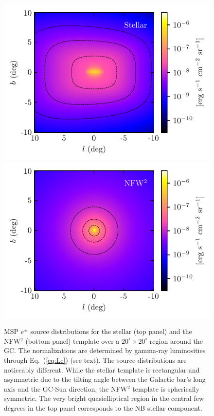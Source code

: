 \documentclass[%
reprint,
superscriptaddress,
amsmath,amssymb,
aps,
floatfix,
]{revtex4-1}
\begin{document}
\begin{figure}[t!]
  \includegraphics[width = \columnwidth]{injection_skymap_bulge.pdf}
  \includegraphics[width = \columnwidth]{injection_skymap_nfw.pdf}
  \caption{MSP $e^\pm$ source distributions for the stellar (top panel) and the NFW$^2$ (bottom panel) template over a $20^\circ \times 20^\circ$ region around the GC. The normalizations are determined by gamma-ray luminosities through Eq.~(\ref{eq:Le}) (see text).
The source distributions are noticeably different. While the stellar template is rectangular and asymmetric due to the tilting angle between the Galactic bar's long axis and the GC-Sun direction, the NFW$^2$ template is spherically symmetric. The very bright quasielliptical region in the central few degrees in the top panel corresponds to the NB stellar component.}
  \label{fig:injection_skymap}
\end{figure}
\end{document}

